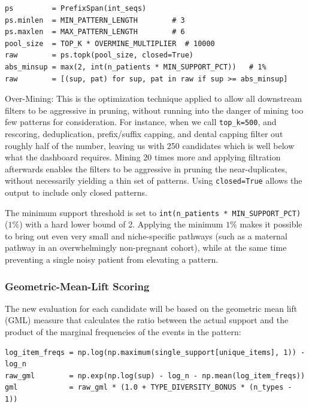 \begin{lstlisting}[style=pythonstyle]
ps         = PrefixSpan(int_seqs)
ps.minlen  = MIN_PATTERN_LENGTH        # 3
ps.maxlen  = MAX_PATTERN_LENGTH        # 6
pool_size  = TOP_K * OVERMINE_MULTIPLIER  # 10000
raw        = ps.topk(pool_size, closed=True)
abs_minsup = max(2, int(n_patients * MIN_SUPPORT_PCT))   # 1%
raw        = [(sup, pat) for sup, pat in raw if sup >= abs_minsup]

\end{lstlisting}

\noindent Over-Mining: This is the optimization technique applied to allow all downstream filters to be aggressive in pruning, without running into the danger of mining too few patterns for consideration. For instance, when we call \texttt{top\_k=500}, and rescoring, deduplication, prefix/suffix capping, and dental capping filter out roughly half of the number, leaving us with 250 candidates which is well below what the dashboard requires. Mining 20 times more and applying filtration afterwards enables the filters to be aggressive in pruning the near-duplicates, without necessarily yielding a thin set of patterns. Using \texttt{closed=True} allows the output to include only closed patterns.

The minimum support threshold is set to \texttt{int(n\_patients * MIN\_SUPPORT\_PCT)} (\(1\%\)) with a hard lower bound of 2. Applying the minimum \(1\%\) makes it possible to bring out even very small and niche-specific pathways (such as a maternal pathway in an overwhelmingly non-pregnant cohort), while at the same time preventing a single noisy patient from elevating a pattern.

\subsubsection*{Geometric-Mean-Lift Scoring}

The new evaluation for each candidate will be based on the geometric mean lift (GML) measure that calculates the ratio between the actual support and the product of the marginal frequencies of the events in the pattern:

\begin{lstlisting}[style=pythonstyle]
log_item_freqs = np.log(np.maximum(single_support[unique_items], 1)) - log_n
raw_gml        = np.exp(np.log(sup) - log_n - np.mean(log_item_freqs))
gml            = raw_gml * (1.0 + TYPE_DIVERSITY_BONUS * (n_types - 1))

\end{lstlisting}

